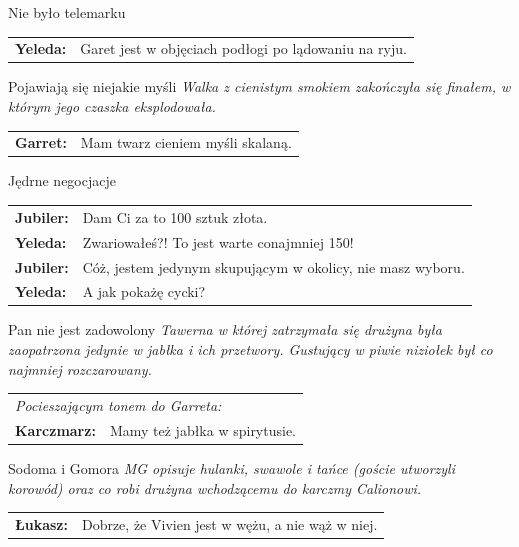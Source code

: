 \documentclass[10pt,twoside,twocolumn]{book}
\begin{document}
\begin{rpg-quotebox}{Nie było telemarku}
   \begin{tabularx}{\columnwidth}{lX}
      \textbf{Yeleda:} & Garet jest w objęciach podłogi po lądowaniu na ryju.
   \end{tabularx}
\end{rpg-quotebox}


\begin{rpg-quotebox}{Pojawiają się niejakie myśli}
   \textit{Walka z cienistym smokiem zakończyła się finałem, w którym jego czaszka eksplodowała.}\\
   
   \begin{tabularx}{\columnwidth}{lX}
      \textbf{Garret:} & Mam twarz cieniem myśli skalaną.\\
   \end{tabularx}
\end{rpg-quotebox}


\begin{rpg-quotebox}{Jędrne negocjacje}
   \begin{tabularx}{\columnwidth}{lX}
      \textbf{Jubiler:} & Dam Ci za to 100 sztuk złota. \\
      \textbf{Yeleda:} & Zwariowałeś?! To jest warte conajmniej 150!\\
      \textbf{Jubiler:} & Cóż, jestem jedynym skupującym w okolicy, nie masz wyboru.\\
      \textbf{Yeleda:} & A jak pokażę cycki?
   \end{tabularx}
\end{rpg-quotebox}
    

\begin{rpg-quotebox}{Pan nie jest zadowolony}
   \textit{Tawerna w której zatrzymała się drużyna była zaopatrzona jedynie w jabłka i ich przetwory. Gustujący w piwie niziołek był co najmniej rozczarowany.}\\
   
   \begin{tabularx}{\columnwidth}{lX}
      \multicolumn{2}{l}{\textit{Pocieszającym tonem do Garreta:}}\\
      
      \textbf{Karczmarz:} & Mamy też jabłka w spirytusie.\\
   \end{tabularx}
\end{rpg-quotebox}


\begin{rpg-quotebox}{Sodoma i Gomora}
   \textit{MG opisuje hulanki, swawole i tańce (goście utworzyli korowód) oraz co robi drużyna wchodzącemu do karczmy Calionowi.}\\
   
   \begin{tabularx}{\columnwidth}{lX}
      \textbf{Łukasz:} & Dobrze, że Vivien jest w wężu, a nie wąż w niej. \\
   \end{tabularx}
\end{rpg-quotebox}
\end{document}
